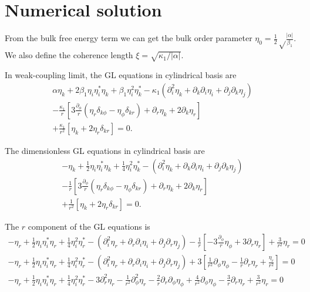 \documentclass[aps,prl,preprint]{revtex4-2}
\begin{document}
\section{Numerical solution}

From the bulk free energy term we can get the bulk order parameter
$\eta_0 = \frac{1}{2}\sqrt\frac{|\alpha|}{\beta_1}$.
We also define the coherence length $\xi = \sqrt{\kappa_1/|\alpha|}$.

In weak-coupling limit, the GL equations in cylindrical basis are
\begin{align}
    \alpha\eta_k+2\beta_1\eta_i\eta_i^*\eta_k
    +\beta_1\eta_i^2\eta_k^*
    -\kappa_1\left(\partial_i^2\eta_k
    +\partial_k\partial_i\eta_i
    +\partial_j\partial_k\eta_j\right)\nonumber\\
    -\frac{\kappa_1}{r}\left[3\frac{\partial_\phi}{r}
    \left(\eta_r\delta_{k\phi}-\eta_\phi\delta_{kr}\right)+\partial_r\eta_k
    +2\partial_k\eta_r\right]\nonumber\\
    +\frac{\kappa_1}{r^2}\left[\eta_k+2\eta_r\delta_{kr}\right]=0.
\end{align}

The dimensionless GL equations in cylindrical basis are
\begin{align}
    -\eta_k+\frac{1}{2}\eta_i\eta_i^*\eta_k
    +\frac{1}{4}\eta_i^2\eta_k^*
    -(\partial_i^2\eta_k
    +\partial_k\partial_i\eta_i
    +\partial_j\partial_k\eta_j)\nonumber\\
    -\frac{1}{r}\left[3\frac{\partial_\phi}{r}
    \left(\eta_r\delta_{k\phi}-\eta_\phi\delta_{kr}\right)+\partial_r\eta_k
    +2\partial_k\eta_r\right]\nonumber\\
    +\frac{1}{r^2}\left[\eta_k+2\eta_r\delta_{kr}\right]=0.
\end{align}

The $r$ component of the GL equations is
\begin{align}
    -\eta_r+\frac{1}{2}\eta_i\eta_i^*\eta_r
    +\frac{1}{4}\eta_i^2\eta_r^*
    -(\partial_i^2\eta_r
    +\partial_r\partial_i\eta_i
    +\partial_j\partial_r\eta_j)
    -\frac{1}{r}\left[-3\frac{\partial_\phi}{r}\eta_\phi
    +3\partial_r\eta_r\right]
    +\frac{3}{r^2}\eta_r=0 \nonumber\\
    -\eta_r+\frac{1}{2}\eta_i\eta_i^*\eta_r
    +\frac{1}{4}\eta_i^2\eta_r^*
    -(\partial_i^2\eta_r
    +\partial_r\partial_i\eta_i
    +\partial_j\partial_r\eta_j)
    +3\left[\frac{1}{r^2}\partial_\phi\eta_\phi
    -\frac{1}{r}\partial_r\eta_r + \frac{\eta_r}{r^2}\right]=0 \nonumber\\
    -\eta_r+\frac{1}{2}\eta_i\eta_i^*\eta_r
    +\frac{1}{4}\eta_i^2\eta_r^*
    -3\partial_r^2\eta_r - \frac{1}{r^2}\partial_\phi^2\eta_r
    -\frac{2}{r}\partial_r\partial_\phi\eta_\phi
    +\frac{4}{r^2}\partial_\phi\eta_\phi
    -\frac{3}{r}\partial_r\eta_r + \frac{3}{r^2}\eta_r=0 \nonumber
\end{align}
\end{document}
